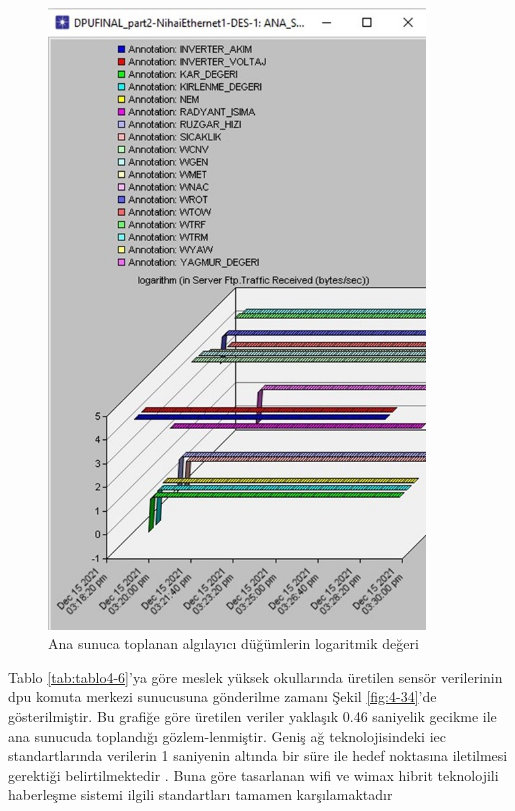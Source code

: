 \begin{figure}[htbp]
\centerline{\includegraphics[width=10cm]{Resim/Sekil4-32.jpg}}
\caption{Ana sunuca toplanan algılayıcı düğümlerin logaritmik değeri}
\label{fig:4-33}
\end{figure}


Tablo \ref{tab:tablo4-6}’ya göre meslek yüksek okullarında üretilen sensör verilerinin \gls{dpu} komuta merkezi sunucusuna gönderilme zamanı Şekil \ref{fig:4-34}’de gösterilmiştir. Bu grafiğe göre üretilen veriler yaklaşık 0.46 saniyelik gecikme ile ana sunucuda toplandığı gözlem-lenmiştir. Geniş ağ teknolojisindeki \gls{iec} standartlarında verilerin 1 saniyenin altında bir süre ile hedef noktasına iletilmesi gerektiği belirtilmektedir \cite{mackiewicz2006overview}. Buna göre tasarlanan \gls{wifi} ve \gls{wimax} hibrit teknolojili haberleşme sistemi ilgili standartları tamamen karşılamaktadır

